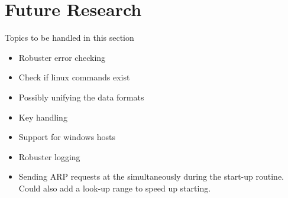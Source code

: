 \section{Future Research} \label{future}

Topics to be handled in this section

\begin{itemize}
\item {Robuster  error checking}
\item {Check if linux commands exist}
\item {Possibly unifying the data formats}
\item {Key handling}
\item {Support for windows hosts}
\item {Robuster logging}
\item {Sending ARP requests at the simultaneously during the start-up routine. Could also add a look-up range to speed up starting.}
\end{itemize}
